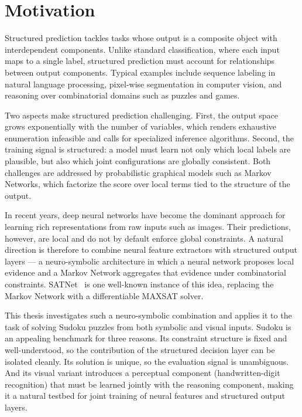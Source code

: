 \section{Motivation}

Structured prediction tackles tasks whose output is a composite
object with interdependent components. Unlike standard
classification, where each input maps to a single label,
structured prediction must account for relationships between
output components. Typical examples include sequence labeling in
natural language processing, pixel-wise segmentation in computer
vision, and reasoning over combinatorial domains such as puzzles
and games.

Two aspects make structured prediction challenging. First, the
output space grows exponentially with the number of variables,
which renders exhaustive enumeration infeasible and calls for
specialized inference algorithms. Second, the training signal is
structured: a model must learn not only which local labels are
plausible, but also which joint configurations are globally
consistent. Both challenges are addressed by probabilistic
graphical models such as Markov Networks, which factorize the
score over local terms tied to the structure of the output.

In recent years, deep neural networks have become the dominant
approach for learning rich representations from raw inputs such
as images. Their predictions, however, are local and do not by
default enforce global constraints. A natural direction is
therefore to combine neural feature extractors with structured
output layers --- a neuro-symbolic architecture in which a neural
network proposes local evidence and a Markov Network aggregates
that evidence under combinatorial constraints.
SATNet~\cite{wang2019satnet} is one well-known instance of this
idea, replacing the Markov Network with a differentiable MAXSAT
solver.

This thesis investigates such a neuro-symbolic combination and
applies it to the task of solving Sudoku puzzles from both
symbolic and visual inputs. Sudoku is an appealing benchmark for
three reasons. Its constraint structure is fixed and
well-understood, so the contribution of the structured decision
layer can be isolated cleanly. Its solution is unique, so the
evaluation signal is unambiguous. And its visual variant
introduces a perceptual component (handwritten-digit recognition)
that must be learned jointly with the reasoning component,
making it a natural testbed for joint training of neural features
and structured output layers.

